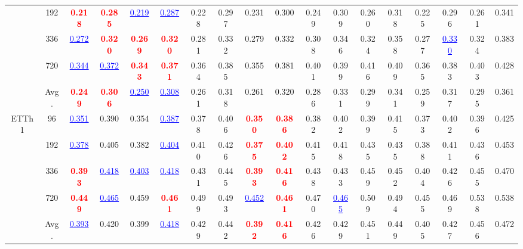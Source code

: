 \begin{table}[t]
{\begin{tabular}{cc|cc|cc|cc|cc|cc|cc|cc|cc}
 & 192 & \textcolor{red}{\textbf{0.218}} & \textcolor{red}{\textbf{0.285}} & \textcolor{blue}{\underline{0.219}} & \textcolor{blue}{\underline{0.287}} & 0.228 & 0.297 & 0.231 & 0.300 & 0.249 & 0.309 & 0.260 & 0.318 & 0.225 & 0.296 & 0.261 & 0.341 \\
 & 336 & \textcolor{blue}{\underline{0.272}} & \textcolor{red}{\textbf{0.320}} & \textcolor{red}{\textbf{0.269}} & \textcolor{red}{\textbf{0.320}} & 0.281 & 0.332 & 0.279 & 0.332 & 0.308 & 0.346 & 0.324 & 0.358 & 0.277 & \textcolor{blue}{\underline{0.330}} & 0.324 & 0.383 \\
 & 720 & \textcolor{blue}{\underline{0.344}} & \textcolor{blue}{\underline{0.372}} & \textcolor{red}{\textbf{0.343}} & \textcolor{red}{\textbf{0.371}} & 0.364 & 0.385 & 0.355 & 0.381 & 0.401 & 0.399 & 0.416 & 0.409 & 0.365 & 0.383 & 0.403 & 0.428 \\
\cmidrule(lr){2-18}
 & Avg. & \textcolor{red}{\textbf{0.249}} & \textcolor{red}{\textbf{0.306}} & \textcolor{blue}{\underline{0.250}} & \textcolor{blue}{\underline{0.308}} & 0.261 & 0.318 & 0.261 & 0.320 & 0.286 & 0.331 & 0.299 & 0.341 & 0.259 & 0.317 & 0.295 & 0.361 \\
\midrule
\multirow{5}{*}{ETTh1} & 96 & \textcolor{blue}{\underline{0.351}} & 0.390 & 0.354 & \textcolor{blue}{\underline{0.387}} & 0.378 & 0.406 & \textcolor{red}{\textbf{0.350}} & \textcolor{red}{\textbf{0.386}} & 0.382 & 0.402 & 0.399 & 0.415 & 0.373 & 0.402 & 0.396 & 0.425 \\
 & 192 & \textcolor{blue}{\underline{0.378}} & 0.405 & 0.382 & \textcolor{blue}{\underline{0.404}} & 0.410 & 0.426 & \textcolor{red}{\textbf{0.375}} & \textcolor{red}{\textbf{0.402}} & 0.415 & 0.418 & 0.435 & 0.435 & 0.388 & 0.411 & 0.436 & 0.453 \\
 & 336 & \textcolor{red}{\textbf{0.393}} & \textcolor{blue}{\underline{0.418}} & \textcolor{blue}{\underline{0.403}} & \textcolor{blue}{\underline{0.418}} & 0.431 & 0.445 & \textcolor{red}{\textbf{0.393}} & \textcolor{red}{\textbf{0.416}} & 0.438 & 0.433 & 0.459 & 0.452 & 0.404 & 0.426 & 0.455 & 0.470 \\
 & 720 & \textcolor{red}{\textbf{0.449}} & \textcolor{blue}{\underline{0.465}} & 0.459 & \textcolor{red}{\textbf{0.461}} & 0.499 & 0.493 & \textcolor{blue}{\underline{0.452}} & \textcolor{red}{\textbf{0.461}} & 0.470 & \textcolor{blue}{\underline{0.465}} & 0.509 & 0.494 & 0.455 & 0.469 & 0.538 & 0.538 \\
\cmidrule(lr){2-18}
 & Avg. & \textcolor{blue}{\underline{0.393}} & 0.420 & 0.399 & \textcolor{blue}{\underline{0.418}} & 0.429 & 0.442 & \textcolor{red}{\textbf{0.392}} & \textcolor{red}{\textbf{0.416}} & 0.426 & 0.429 & 0.451 & 0.449 & 0.405 & 0.427 & 0.456 & 0.472 \\

\end{tabular}}
\end{table}
